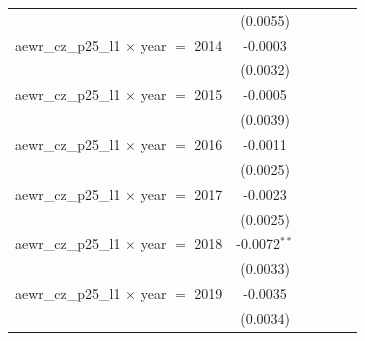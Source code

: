 \begin{tabular}{lccccc}
                                                                & (0.0055)           &                 &                       &                            &   \\   
   aewr\_cz\_p25\_l1 $\times$ year $=$ 2014                     & -0.0003            &                 &                       &                            &   \\   
                                                                & (0.0032)           &                 &                       &                            &   \\   
   aewr\_cz\_p25\_l1 $\times$ year $=$ 2015                     & -0.0005            &                 &                       &                            &   \\   
                                                                & (0.0039)           &                 &                       &                            &   \\   
   aewr\_cz\_p25\_l1 $\times$ year $=$ 2016                     & -0.0011            &                 &                       &                            &   \\   
                                                                & (0.0025)           &                 &                       &                            &   \\   
   aewr\_cz\_p25\_l1 $\times$ year $=$ 2017                     & -0.0023            &                 &                       &                            &   \\   
                                                                & (0.0025)           &                 &                       &                            &   \\   
   aewr\_cz\_p25\_l1 $\times$ year $=$ 2018                     & -0.0072$^{**}$     &                 &                       &                            &   \\   
                                                                & (0.0033)           &                 &                       &                            &   \\   
   aewr\_cz\_p25\_l1 $\times$ year $=$ 2019                     & -0.0035            &                 &                       &                            &   \\   
                                                                & (0.0034)           &                 &                       &                            &   \\   

\end{tabular}
